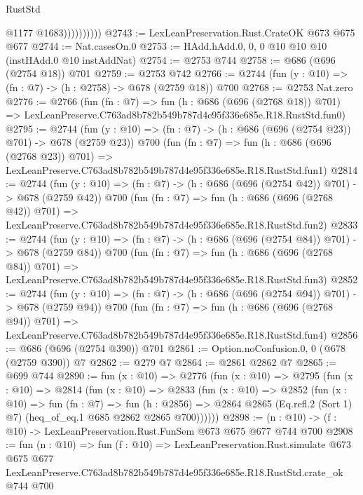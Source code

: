 \begin{lexlean}{RustStd}
\begin{coremodule}
                        @1177
                        @1683))))))))))
@2743 := LexLeanPreservation.Rust.CrateOK @673 @675 @677
@2744 := Nat.casesOn.{0}
@2753 := HAdd.hAdd.{0, 0, 0} @10 @10 @10 (instHAdd.{0} @10 instAddNat)
@2754 := @2753 @744
@2758 := @686 (@696 (@2754 @18)) @701
@2759 := @2753 @742
@2766 := @2744 (fun (y : @10) => (fn : @7) -> (h : @2758) -> @678 (@2759 @18)) @700
@2768 := @2753 Nat.zero
@2776 := @2766
    (fun (fn : @7) =>
    fun (h : @686 (@696 (@2768 @18)) @701) =>
    LexLeanPreserve.C763ad8b782b549b787d4e95f336e685e.R18.RustStd.fun0)
@2795 := @2744
    (fun (y : @10) => (fn : @7) -> (h : @686 (@696 (@2754 @23)) @701) -> @678 (@2759 @23))
    @700
    (fun (fn : @7) =>
    fun (h : @686 (@696 (@2768 @23)) @701) =>
    LexLeanPreserve.C763ad8b782b549b787d4e95f336e685e.R18.RustStd.fun1)
@2814 := @2744
    (fun (y : @10) => (fn : @7) -> (h : @686 (@696 (@2754 @42)) @701) -> @678 (@2759 @42))
    @700
    (fun (fn : @7) =>
    fun (h : @686 (@696 (@2768 @42)) @701) =>
    LexLeanPreserve.C763ad8b782b549b787d4e95f336e685e.R18.RustStd.fun2)
@2833 := @2744
    (fun (y : @10) => (fn : @7) -> (h : @686 (@696 (@2754 @84)) @701) -> @678 (@2759 @84))
    @700
    (fun (fn : @7) =>
    fun (h : @686 (@696 (@2768 @84)) @701) =>
    LexLeanPreserve.C763ad8b782b549b787d4e95f336e685e.R18.RustStd.fun3)
@2852 := @2744
    (fun (y : @10) => (fn : @7) -> (h : @686 (@696 (@2754 @94)) @701) -> @678 (@2759 @94))
    @700
    (fun (fn : @7) =>
    fun (h : @686 (@696 (@2768 @94)) @701) =>
    LexLeanPreserve.C763ad8b782b549b787d4e95f336e685e.R18.RustStd.fun4)
@2856 := @686 (@696 (@2754 @390)) @701
@2861 := Option.noConfusion.{0, 0} (@678 (@2759 @390)) @7
@2862 := @279 @7
@2864 := @2861 @2862 @7
@2865 := @699 @744
@2890 := fun (x : @10) =>
  @2776
    (fun (x : @10) =>
    @2795
      (fun (x : @10) =>
      @2814
        (fun (x : @10) =>
        @2833
          (fun (x : @10) =>
          @2852
            (fun (x : @10) =>
            fun (fn : @7) =>
            fun (h : @2856) =>
            @2864 @2865 (Eq.refl.{2} (Sort 1) @7) (heq_of_eq.{1} @685 @2862 @2865 @700))))))
@2898 := (n : @10) -> (f : @10) -> LexLeanPreservation.Rust.FunSem @673 @675 @677 @744 @700
@2908 := fun (n : @10) =>
  fun (f : @10) =>
  LexLeanPreservation.Rust.simulate
    @673
    @675
    @677
    LexLeanPreserve.C763ad8b782b549b787d4e95f336e685e.R18.RustStd.crate_ok
    @744
    @700
\end{coremodule}
\end{lexlean}
